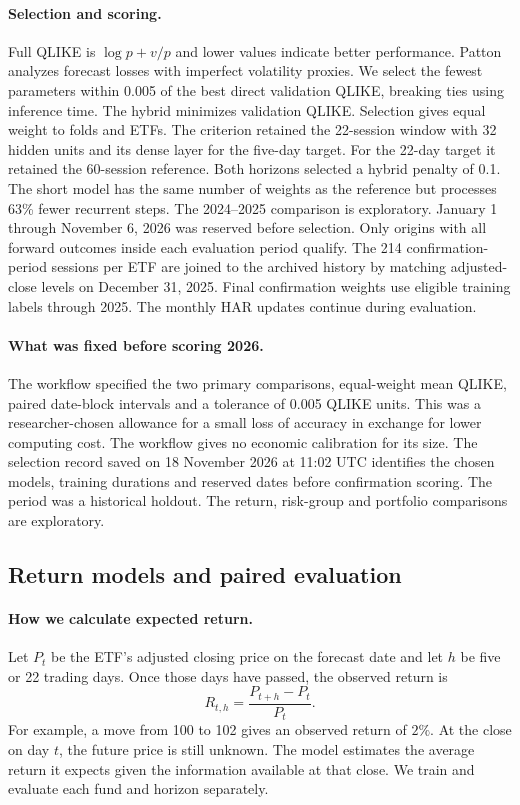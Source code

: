 \documentclass[11pt]{article}
\begin{document}
\paragraph{Selection and scoring.} Full QLIKE is $\log p+v/p$ and lower values indicate better performance. Patton~\cite{patton} analyzes forecast losses with imperfect volatility proxies. We select the fewest parameters within 0.005 of the best direct validation QLIKE, breaking ties using inference time. The hybrid minimizes validation QLIKE. Selection gives equal weight to folds and ETFs. The criterion retained the 22-session window with 32 hidden units and its dense layer for the five-day target. For the 22-day target it retained the 60-session reference. Both horizons selected a hybrid penalty of 0.1. The short model has the same number of weights as the reference but processes 63\% fewer recurrent steps. The 2024--2025 comparison is exploratory. January 1 through November 6, 2026 was reserved before selection. Only origins with all forward outcomes inside each evaluation period qualify. The 214 confirmation-period sessions per ETF are joined to the archived history by matching adjusted-close levels on December 31, 2025. Final confirmation weights use eligible training labels through 2025. The monthly HAR updates continue during evaluation.
\paragraph{What was fixed before scoring 2026.} The workflow specified the two primary comparisons, equal-weight mean QLIKE, paired date-block intervals and a tolerance of 0.005 QLIKE units. This was a researcher-chosen allowance for a small loss of accuracy in exchange for lower computing cost. The workflow gives no economic calibration for its size. The selection record saved on 18 November 2026 at 11:02 UTC identifies the chosen models, training durations and reserved dates before confirmation scoring. The period was a historical holdout. The return, risk-group and portfolio comparisons are exploratory.

\subsection{Return models and paired evaluation}
\paragraph{How we calculate expected return.} Let $P_t$ be the ETF's adjusted closing price on the forecast date and let $h$ be five or 22 trading days. Once those days have passed, the observed return is
\[
R_{t,h}=\frac{P_{t+h}-P_t}{P_t}.
\]
For example, a move from 100 to 102 gives an observed return of $2\%$. At the close on day $t$, the future price is still unknown. The model estimates the average return it expects given the information available at that close. We train and evaluate each fund and horizon separately.
\end{document}
